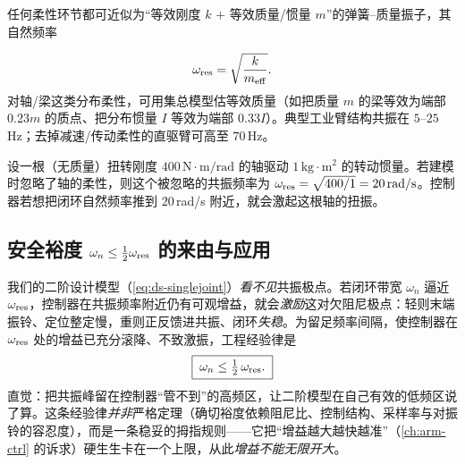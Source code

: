 任何柔性环节都可近似为“等效刚度 $k$ $+$ 等效质量/惯量 $m$”的弹簧--质量振子，其自然频率

\begin{equation}
\omega_{\rm res}=\sqrt{\frac{k}{m_{\rm eff}}}.
\label{eq:ds-omegares}
\end{equation}
对轴/梁这类分布柔性，可用集总模型估等效质量（如把质量 $m$ 的梁等效为端部 $0.23m$ 的质点、把分布惯量 $I$ 等效为端部 $0.33I$）。典型工业臂结构共振在 $5$--$25\,$Hz；去掉减速/传动柔性的直驱臂可高至 $70\,$Hz。

\begin{example}[一根轴的未建模共振]
\label{ex:ds-shaft-res}
设一根（无质量）扭转刚度 $400\,\mathrm{N\cdot m/rad}$ 的轴驱动 $1\,\mathrm{kg\cdot m^2}$ 的转动惯量。若建模时忽略了轴的柔性，则这个被忽略的共振频率为 $\omega_{\rm res}=\sqrt{400/1}=20\,\mathrm{rad/s}$。控制器若想把闭环自然频率推到 $20\,$rad/s 附近，就会激起这根轴的扭振。
\end{example}

\subsection{安全裕度 $\omega_n\le\tfrac12\omega_{\rm res}$ 的来由与应用}
\label{sec:ds-margin}

\begin{insight}
\label{ins:ds-half-rule}
我们的二阶设计模型（\cref{eq:ds-singlejoint}）\emph{看不见}共振极点。若闭环带宽 $\omega_n$ 逼近 $\omega_{\rm res}$，控制器在共振频率附近仍有可观增益，就会\emph{激励}这对欠阻尼极点：轻则末端振铃、定位整定慢，重则正反馈进共振、闭环\emph{失稳}。为留足频率间隔，使控制器在 $\omega_{\rm res}$ 处的增益已充分滚降、不致激振，工程经验律是
\begin{equation}
\boxed{\;\omega_n\le\tfrac12\,\omega_{\rm res}.\;}
\label{eq:ds-half-rule}
\end{equation}
直觉：把共振峰留在控制器“管不到”的高频区，让二阶模型在自己有效的低频区说了算。这条经验律\emph{并非}严格定理（确切裕度依赖阻尼比、控制结构、采样率与对振铃的容忍度），而是一条稳妥的拇指规则——它把“增益越大越快越准”（\cref{ch:arm-ctrl} 的诉求）硬生生卡在一个上限，从此\emph{增益不能无限开大}。
\end{insight}

